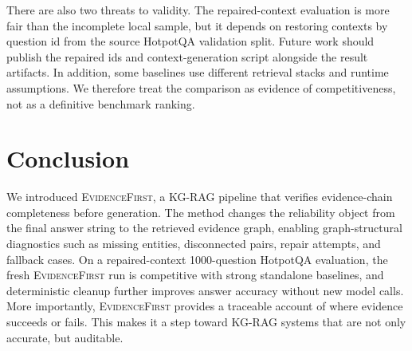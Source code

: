 \documentclass[runningheads]{llncs}
\newcommand{\sys}{\textsc{EvidenceFirst}\xspace}
\begin{document}
There are also two threats to validity. The repaired-context evaluation is more
fair than the incomplete local sample, but it depends on restoring contexts by
question id from the source HotpotQA validation split. Future work should
publish the repaired ids and context-generation script alongside the result
artifacts. In addition, some baselines use different retrieval stacks and
runtime assumptions. We therefore treat the comparison as evidence of
competitiveness, not as a definitive benchmark ranking.

\section{Conclusion}
\label{sec:conclusion}

We introduced \sys, a KG-RAG pipeline that verifies evidence-chain completeness
before generation. The method changes the reliability object from the final
answer string to the retrieved evidence graph, enabling graph-structural
diagnostics such as missing entities, disconnected pairs, repair attempts, and
fallback cases. On a repaired-context 1000-question HotpotQA evaluation, the
fresh \sys run is competitive with strong standalone baselines, and deterministic
cleanup further improves answer accuracy without new model calls. More
importantly, \sys provides a traceable account of where evidence succeeds or
fails. This makes it a step toward KG-RAG systems that are not only accurate,
but auditable.



\end{document}
